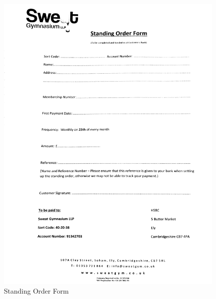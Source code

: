 \begin{figure}[H]
    \includegraphics[width=\textwidth]{StandingOrderForm,jpeg.jpg}
    \caption{Standing Order Form} \label{fig:Standing Order Form }
\end{figure}

